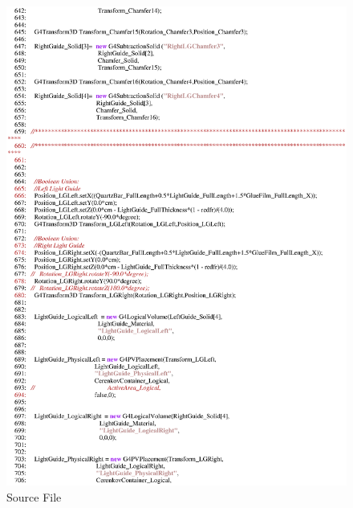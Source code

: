 \begin{figure}[ht]
  \hspace{0cm}
  \includegraphics[scale=0.8]{./figures5/QweakSimCerenkovDetector.cc-p11.eps}
  \caption{\label{SourceV11} Source File}
           \label{fig:V-SC-15}
\end{figure}
\clearpage

